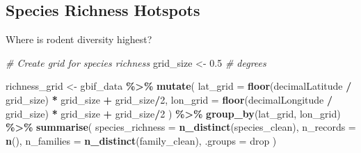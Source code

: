 \documentclass[
]{article}
\newenvironment{Shaded}{\begin{snugshade}}{\end{snugshade}}
\newcommand{\AttributeTok}[1]{\textcolor[rgb]{0.13,0.29,0.53}{#1}}
\newcommand{\CommentTok}[1]{\textcolor[rgb]{0.56,0.35,0.01}{\textit{#1}}}
\newcommand{\DecValTok}[1]{\textcolor[rgb]{0.00,0.00,0.81}{#1}}
\newcommand{\FloatTok}[1]{\textcolor[rgb]{0.00,0.00,0.81}{#1}}
\newcommand{\FunctionTok}[1]{\textcolor[rgb]{0.13,0.29,0.53}{\textbf{#1}}}
\newcommand{\NormalTok}[1]{#1}
\newcommand{\OtherTok}[1]{\textcolor[rgb]{0.56,0.35,0.01}{#1}}
\newcommand{\SpecialCharTok}[1]{\textcolor[rgb]{0.81,0.36,0.00}{\textbf{#1}}}
\newcommand{\StringTok}[1]{\textcolor[rgb]{0.31,0.60,0.02}{#1}}
\begin{document}
\subsection{Species Richness Hotspots}\label{species-richness-hotspots}

Where is rodent diversity highest?

\begin{Shaded}
\begin{Highlighting}[]
\CommentTok{\# Create grid for species richness}
\NormalTok{grid\_size }\OtherTok{\textless{}{-}} \FloatTok{0.5}  \CommentTok{\# degrees}

\NormalTok{richness\_grid }\OtherTok{\textless{}{-}}\NormalTok{ gbif\_data }\SpecialCharTok{\%\textgreater{}\%}
  \FunctionTok{mutate}\NormalTok{(}
    \AttributeTok{lat\_grid =} \FunctionTok{floor}\NormalTok{(decimalLatitude }\SpecialCharTok{/}\NormalTok{ grid\_size) }\SpecialCharTok{*}\NormalTok{ grid\_size }\SpecialCharTok{+}\NormalTok{ grid\_size}\SpecialCharTok{/}\DecValTok{2}\NormalTok{,}
    \AttributeTok{lon\_grid =} \FunctionTok{floor}\NormalTok{(decimalLongitude }\SpecialCharTok{/}\NormalTok{ grid\_size) }\SpecialCharTok{*}\NormalTok{ grid\_size }\SpecialCharTok{+}\NormalTok{ grid\_size}\SpecialCharTok{/}\DecValTok{2}
\NormalTok{  ) }\SpecialCharTok{\%\textgreater{}\%}
  \FunctionTok{group\_by}\NormalTok{(lat\_grid, lon\_grid) }\SpecialCharTok{\%\textgreater{}\%}
  \FunctionTok{summarise}\NormalTok{(}
    \AttributeTok{species\_richness =} \FunctionTok{n\_distinct}\NormalTok{(species\_clean),}
    \AttributeTok{n\_records =} \FunctionTok{n}\NormalTok{(),}
    \AttributeTok{n\_families =} \FunctionTok{n\_distinct}\NormalTok{(family\_clean),}
    \AttributeTok{.groups =} \StringTok{\textquotesingle{}drop\textquotesingle{}}
\NormalTok{  )}


\end{Highlighting}
\end{Shaded}
\end{document}
